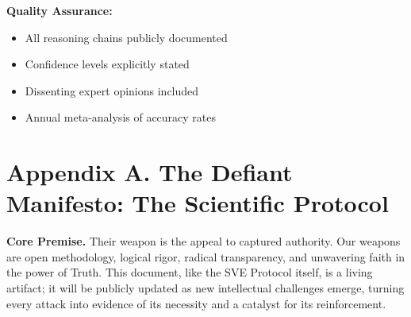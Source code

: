 \documentclass[11pt,a4paper]{article}
\begin{document}
\textbf{Quality Assurance:}
\begin{itemize}[nosep]
    \item All reasoning chains publicly documented
    \item Confidence levels explicitly stated
    \item Dissenting expert opinions included
    \item Annual meta-analysis of accuracy rates
\end{itemize}



\clearpage %



\section*{Appendix A. The Defiant Manifesto: The Scientific Protocol}
\label{app:manifesto}

\vspace{1em}

\noindent{}

\vspace{1.5em}

\noindent\textbf{\textcolor{headercolor}{Core Premise.}} Their weapon is the appeal to captured authority. Our weapons are open methodology, logical rigor, radical transparency, and unwavering faith in the power of Truth. This document, like the SVE Protocol itself, is a living artifact; it will be publicly updated as new intellectual challenges emerge, turning every attack into evidence of its necessity and a catalyst for its reinforcement.
\end{document}
